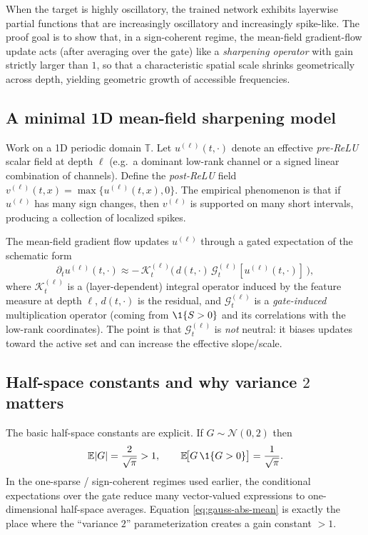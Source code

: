 When the target is highly oscillatory, the trained network exhibits layerwise partial functions that are increasingly oscillatory and increasingly spike-like.
The proof goal is to show that, in a sign-coherent regime, the mean-field gradient-flow update acts (after averaging over the gate) like a \emph{sharpening operator} with gain strictly larger than $1$, so that a characteristic spatial scale shrinks geometrically across depth, yielding geometric growth of accessible frequencies.

\subsection{A minimal 1D mean-field sharpening model}

Work on a 1D periodic domain $\mathbb{T}$.
Let $u^{(\ell)}(t,\cdot)$ denote an effective \emph{pre-ReLU} scalar field at depth $\ell$ (e.g.\ a dominant low-rank channel or a signed linear combination of channels).
Define the \emph{post-ReLU} field $v^{(\ell)}(t,x)=\max\{u^{(\ell)}(t,x),0\}$.
The empirical phenomenon is that if $u^{(\ell)}$ has many sign changes, then $v^{(\ell)}$ is supported on many short intervals, producing a collection of localized spikes.

The mean-field gradient flow updates $u^{(\ell)}$ through a gated expectation of the schematic form
\begin{equation}\label{eq:depth-operator-schematic}
\partial_t u^{(\ell)}(t,\cdot)\approx -\,\mathcal{K}^{(\ell)}_t\Big(\,d(t,\cdot)\,\mathcal{G}^{(\ell)}_t[u^{(\ell)}(t,\cdot)]\,\Big),
\end{equation}
where $\mathcal{K}^{(\ell)}_t$ is a (layer-dependent) integral operator induced by the feature measure at depth $\ell$, $d(t,\cdot)$ is the residual, and $\mathcal{G}^{(\ell)}_t$ is a \emph{gate-induced} multiplication operator (coming from $\1\{S>0\}$ and its correlations with the low-rank coordinates).
The point is that $\mathcal{G}^{(\ell)}_t$ is \emph{not} neutral: it biases updates toward the active set and can increase the effective slope/scale.

\subsection{Half-space constants and why variance $2$ matters}

The basic half-space constants are explicit.
If $G\sim\mathcal{N}(0,2)$ then
\begin{equation}\label{eq:gauss-abs-mean}
\E|G|=\frac{2}{\sqrt{\pi}}>1,\qquad
\E\!\big[G\,\1\{G>0\}\big]=\frac{1}{\sqrt{\pi}}.
\end{equation}
In the one-sparse / sign-coherent regimes used earlier, the conditional expectations over the gate reduce many vector-valued expressions to one-dimensional half-space averages.
Equation \eqref{eq:gauss-abs-mean} is exactly the place where the ``variance $2$'' parameterization creates a gain constant $>1$.

